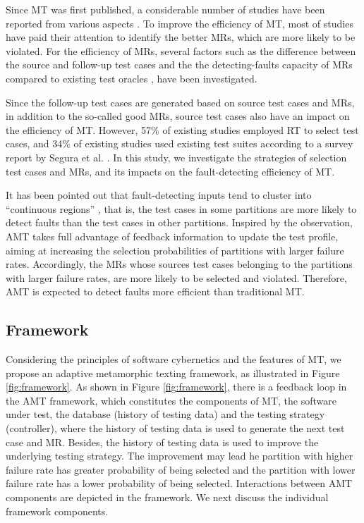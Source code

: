 \documentclass[10pt,journal,compsoc]{IEEEtran}
\begin{document}
Since MT was first published, a considerable number of studies have been reported from various aspects \cite{segura2016survey}. To improve the efficiency of MT, most of studies have paid their attention to identify the better MRs, which are more likely to be violated. For the  efficiency of MRs, several factors such as the difference between the source and follow-up test cases \cite{chen2004case, cao2013correlation} and the the detecting-faults capacity of MRs compared to existing test oracles \cite{liu2014effectively}, have been investigated.

Since the follow-up test cases are generated based on source test cases and MRs, in addition to the so-called good MRs, source test cases also have an impact on the efficiency of MT. However, 57\% of existing studies employed RT to select test cases, and 34\% of existing studies used existing test suites according to a survey report by Segura et al. \cite{segura2016survey}. In this study, we investigate the strategies of selection test cases and MRs, and its impacts on the fault-detecting efficiency of MT.

It has been pointed out that fault-detecting inputs tend to cluster into ``continuous regions'' \cite{ammann1988data, finelli1991nasa}, that is, the test cases in some partitions are more likely to detect faults than the test cases in other partitions. Inspired by the observation, AMT takes full advantage of feedback information to update the test profile, aiming at increasing the selection probabilities of partitions with larger failure rates. Accordingly, the MRs whose sources test cases belonging to the partitions with larger failure rates, are more likely to be selected and violated. Therefore, AMT is expected to detect faults more efficient than traditional MT.

\subsection{Framework}
\label{sec:framework}

Considering the principles of software cybernetics and the features of MT, we propose an adaptive metamorphic texting framework, as
illustrated in Figure \ref{fig:framework}. As shown in Figure \ref{fig:framework}, there is a feedback loop in the AMT framework, which constitutes the components of MT, the software under test, the database (history of testing data) and the testing strategy (controller), where the history of testing data is used to generate the next test case and MR. Besides, the history of testing data is used to improve the underlying testing strategy. The improvement may lead he partition with higher failure rate has greater probability of being selected and the partition with lower failure rate has a lower probability of being selected. Interactions between AMT components are depicted in the framework. We next discuss the individual framework components.
\end{document}
